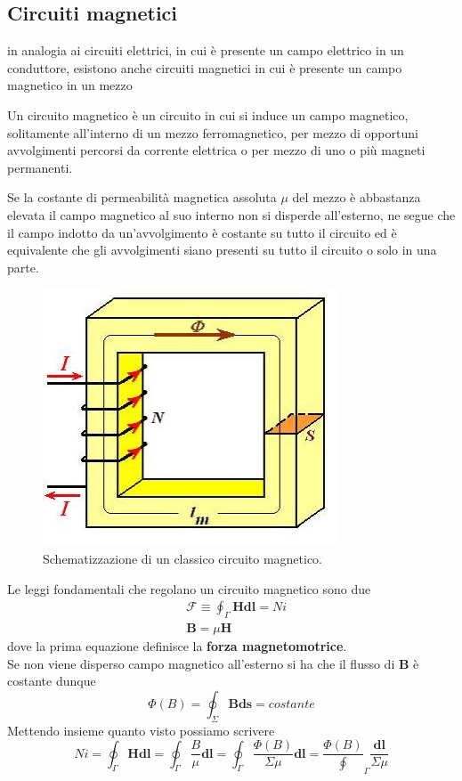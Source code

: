 \documentclass[
10pt, %
a4paper, %
oneside, %
headinclude,footinclude, %
BCOR5mm, %
]{scrartcl}
\begin{document}
\subsection{Circuiti magnetici}
in analogia ai circuiti elettrici, in cui è presente un campo elettrico in un conduttore, esistono anche circuiti magnetici in cui è presente un campo magnetico in un mezzo 
\begin{definizione}
	Un circuito magnetico è un circuito in cui si induce un campo magnetico, solitamente all'interno di un mezzo ferromagnetico, per mezzo di opportuni avvolgimenti percorsi da corrente elettrica o per mezzo di uno o più magneti permanenti.
\end{definizione}
Se la costante di permeabilità magnetica assoluta \(\mu\) del mezzo è abbastanza elevata il campo magnetico al suo interno non si disperde all'esterno, ne segue che il campo indotto da un'avvolgimento è costante su tutto il circuito ed è equivalente che gli avvolgimenti siano presenti su tutto il circuito o solo in una parte.
\begin{figure}[h!]
	\centering
	\includegraphics[width=0.4\linewidth]{../images/circuito-magnetico}
	\caption{Schematizzazione di un classico circuito magnetico.}
	\label{fig:circuito-magnetico}
\end{figure}
\FloatBarrier
Le leggi fondamentali che regolano un circuito magnetico sono due
\begin{align*}
	&\mathcal{F}\equiv\oint_{\Gamma}\mathbf{H}\mathbf{dl} = N i\\
	&\mathbf{B} = \mu\mathbf{H}
\end{align*}
dove la prima equazione definisce la \textbf{forza magnetomotrice}.\\
Se non viene disperso campo magnetico all'esterno si ha che il flusso di \(\mathbf{B}\) è costante dunque 
\[\Phi(B) = \oint_{\Sigma}\mathbf{B}\mathbf{ds} = costante\]
Mettendo insieme quanto visto possiamo scrivere
\[Ni = \oint_{\Gamma}\mathbf{H}\mathbf{dl} = \oint_{\Gamma}\frac{B}{\mu}\mathbf{dl}=\oint_{\Gamma}\frac{\Phi(B)}{\Sigma\mu}\mathbf{dl} =\frac{\Phi(B)}\oint_{\Gamma}\frac{\mathbf{dl}}{\Sigma\mu}\]
\end{document}
